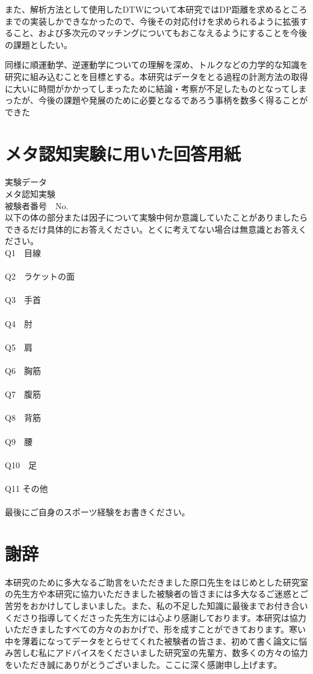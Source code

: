 \documentclass[11pt,a4j,notitlepage]{jreport}
\begin{document}
また、解析方法として使用したDTWについて本研究ではDP距離を求めるところまでの実装しかできなかったので、今後その対応付けを求められるように拡張すること、および多次元のマッチングについてもおこなえるようにすることを今後の課題としたい。

同様に順運動学、逆運動学についての理解を深め、トルクなどの力学的な知識を研究に組み込むことを目標とする。本研究はデータをとる過程の計測方法の取得に大いに時間がかかってしまったために結論・考察が不足したものとなってしまったが、今後の課題や発展のために必要となるであろう事柄を数多く得ることができた


\appendix




\def\thesection{A\Alph{section}}
\chapter{メタ認知実験に用いた回答用紙}
実験データ\\
メタ認知実験\\
被験者番号　No.\\
以下の体の部分または因子について実験中何か意識していたことがありましたらできるだけ具体的にお答えください。とくに考えてない場合は無意識とお答えください。\\
Q1　目線\\\\
Q2　ラケットの面\\\\
Q3　手首\\\\
Q4　肘　\\\\
Q5　肩\\\\
Q6　胸筋\\\\
Q7　腹筋\\\\
Q8　背筋\\\\
Q9　腰\\\\
Q10　足\\\\
Q11 その他\\\\
最後にご自身のスポーツ経験をお書きください。\\




\def\thesection{C\Alph{section}}

\chapter*{謝辞}
本研究のために多大なるご助言をいただきました原口先生をはじめとした研究室の先生方や本研究に協力いただきました被験者の皆さまには多大なるご迷惑とご苦労をおかけしてしまいました。また、私の不足した知識に最後までお付き合いくださり指導してくださった先生方には心より感謝しております。本研究は協力いただきましたすべての方々のおかげで、形を成すことができております。寒い中を薄着になってデータをとらせてくれた被験者の皆さま、初めて書く論文に悩み苦しむ私にアドバイスをくださいました研究室の先輩方、数多くの方々の協力をいただき誠にありがとうございました。ここに深く感謝申し上げます。
\end{document}
